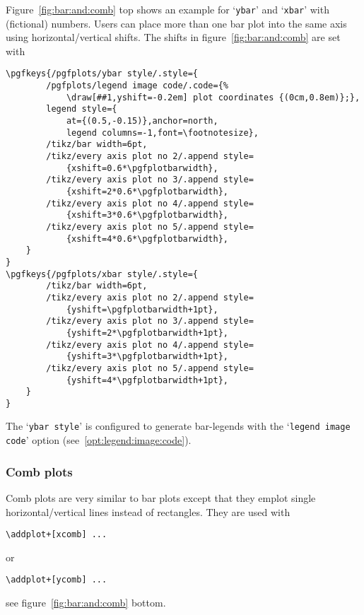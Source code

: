 Figure~\ref{fig:bar:and:comb} top shows an example for `\texttt{ybar}' and `\texttt{xbar}' with (fictional) numbers. Users can place more than one bar plot into the same axis using horizontal/vertical shifts. The shifts in figure~\ref{fig:bar:and:comb} are set with
\label{xybar:styles}
\begin{lstlisting}[basicstyle=\footnotesize\ttfamily]
\pgfkeys{/pgfplots/ybar style/.style={
		/pgfplots/legend image code/.code={%
			\draw[##1,yshift=-0.2em] plot coordinates {(0cm,0.8em)};},
		legend style={
			at={(0.5,-0.15)},anchor=north,
			legend columns=-1,font=\footnotesize},
		/tikz/bar width=6pt,
		/tikz/every axis plot no 2/.append style=
			{xshift=0.6*\pgfplotbarwidth},
		/tikz/every axis plot no 3/.append style=
			{xshift=2*0.6*\pgfplotbarwidth},
		/tikz/every axis plot no 4/.append style=
			{xshift=3*0.6*\pgfplotbarwidth},
		/tikz/every axis plot no 5/.append style=
			{xshift=4*0.6*\pgfplotbarwidth},
	}
}
\pgfkeys{/pgfplots/xbar style/.style={
		/tikz/bar width=6pt,
		/tikz/every axis plot no 2/.append style=
			{yshift=\pgfplotbarwidth+1pt},
		/tikz/every axis plot no 3/.append style=
			{yshift=2*\pgfplotbarwidth+1pt},
		/tikz/every axis plot no 4/.append style=
			{yshift=3*\pgfplotbarwidth+1pt},
		/tikz/every axis plot no 5/.append style=
			{yshift=4*\pgfplotbarwidth+1pt},
	}
}
\end{lstlisting}
The `\texttt{ybar style}' is configured to generate bar-legends with the `\texttt{legend image code}' option (see~\ref{opt:legend:image:code}).

\subsubsection{Comb plots}
Comb plots are very similar to bar plots except that they emplot single horizontal/vertical lines instead of rectangles. They are used with
\begin{lstlisting}
\addplot+[xcomb] ...
\end{lstlisting}
or 
\begin{lstlisting}
\addplot+[ycomb] ...
\end{lstlisting}
see figure~\ref{fig:bar:and:comb} bottom.

